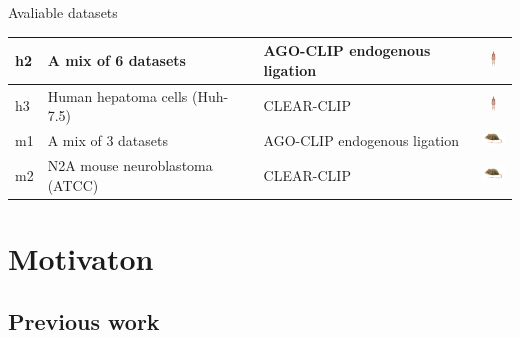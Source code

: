 \documentclass{beamer}
\begin{document}
\begin{frame}{Avaliable datasets}
\begin{table}[h!]
{\begin{tabular}{|l|p{5cm}|p{4cm}|c|}
    h2 &
	A mix of 6 datasets & 
	AGO-CLIP endogenous ligation &  
	\includegraphics[height=0.4cm]{images/human.png} \\
	\hline
	
    h3 &
	Human hepatoma cells (Huh-7.5) & 
	CLEAR-CLIP & 
	\includegraphics[height=0.4cm]{images/human.png} \\
	\hline
	
    m1 &
	A mix of 3 datasets & 
	AGO-CLIP endogenous ligation & 
	 \includegraphics[height=0.4cm]{images/mosmus.jpg} \\
	\hline
	
    m2 &
	N2A mouse neuroblastoma (ATCC) & 
	CLEAR-CLIP & 
	\includegraphics[height=0.4cm]{images/mosmus.jpg} \\
	\hline
\end{tabular}}
\end{table}


\end{frame}


\section{Motivaton}

\subsection{Previous work}
\end{document}
